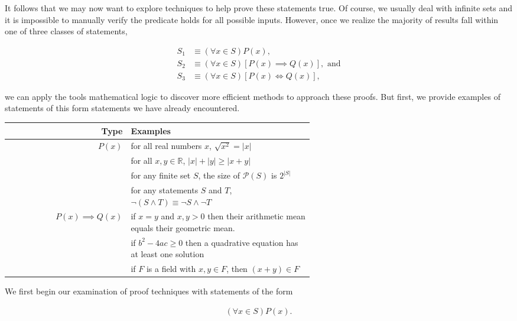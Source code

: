 It follows that we may now want to explore techniques to help prove these statements true. Of course, we usually deal with infinite sets and it is impossible to manually verify the predicate holds for all possible inputs. However, once we realize the majority of results fall within one of three classes of statements, 

\begin{align*}
	S_1 &\equiv (\forall x \in S)P(x), \\
	S_2 &\equiv (\forall x \in S)[P(x) \implies Q(x)], \text{ and} \\
	S_3 &\equiv (\forall x \in S)[P(x) \iff Q(x)],
\end{align*} 

we can apply the tools mathematical logic to discover more efficient methods to approach these proofs. But first, we provide examples of statements  of this form statements we have already encountered.

\vspace{\baselineskip}
\begin{center}
	\begin{tabular}{rp{0.6\linewidth}}
		\toprule
		Type & Examples \\
		\midrule
		$P(x)$ & for all real numbers $x$, $\sqrt{x^2} = |x|$ \\
		& for all $x, y \in \mathbb{R}$, $|x| + |y| \ge |x +y|$ \\
		& for any finite set $S$, the size of $\mathcal{P}(S)$ is $2^{|S|}$ \\
		& for any statements $S$ and $T$, $\neg(S \wedge T) \equiv \neg S \wedge \neg T $ \vspace{0.25\baselineskip} \\
		$P(x) \implies Q(x)$ & if $x = y$ and $x, y > 0$ then their arithmetic mean equals their geometric mean. \\
		& if $b^2 - 4ac \ge 0$ then a quadrative equation has at least one solution \\
		& if $F$ is a field with $x, y \in F$, then $(x + y) \in F$ \\
		\bottomrule
	\end{tabular}
\end{center}
\vspace{\baselineskip}

We first begin our examination of proof techniques with statements of the form

\begin{align*}
	(\forall x \in S)P(x).
\end{align*}

